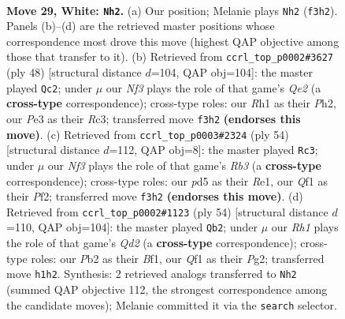 \documentclass[11pt]{article}
\begin{document}
\clearpage

\begin{figure}[p]\centering
\begin{subfigure}{0.46\textwidth}\centering
\resizebox{\linewidth}{!}{%
\newchessgame
\chessboard[
  setfen={rk3b2/pp4pr/2p1b2p/P2p1p2/2qP3P/2B1PN2/1PK2PP1/1R3Q1R w - - 9 29},
  showmover=false,
  pgfstyle=straightmove, color=movearrow, markmove={f3-h2}
]}
\caption{}
\end{subfigure}\hfill
\begin{subfigure}{0.46\textwidth}\centering
\resizebox{\linewidth}{!}{%
\newchessgame
\chessboard[
  setfen={r3n1k1/3p1rpp/p3pp2/1qBbP3/2NP1P2/2R5/1P2Q1PP/5RK1 w - - 4 25},
  showmover=false,
  pgfstyle=straightmove, color=movearrow, markmove={e2-c2}
]}
\caption{}
\end{subfigure}
\\[4pt]
\begin{subfigure}{0.46\textwidth}\centering
\resizebox{\linewidth}{!}{%
\newchessgame
\chessboard[
  setfen={3r2k1/3rpp2/1p3b1p/p1q1pPp1/4B3/PR3QPP/1PP2P2/4R1K1 w - - 0 28},
  showmover=false,
  pgfstyle=straightmove, color=movearrow, markmove={b3-c3}
]}
\caption{}
\end{subfigure}\hfill
\begin{subfigure}{0.46\textwidth}\centering
\resizebox{\linewidth}{!}{%
\newchessgame
\chessboard[
  setfen={3r2r1/1p1npbk1/3p1pp1/p6p/PqP1P2P/1PN1R3/3Q1PP1/1R3BK1 w - - 2 28},
  showmover=false,
  pgfstyle=straightmove, color=movearrow, markmove={d2-b2}
]}
\caption{}
\end{subfigure}
\caption{\textbf{Move 29, White: \texttt{Nh2}.} (a) Our position; Melanie plays \texttt{Nh2} (\texttt{f3h2}). Panels (b)--(d) are the retrieved master positions whose correspondence most drove this move (highest QAP objective among those that transfer to it). (b) Retrieved from \texttt{ccrl\_top\_p0002\#3627} (ply 48) [structural distance $d$=104, QAP obj=104]: the master played \texttt{Qc2}; under $\mu$ our \emph{Nf3} plays the role of that game's \emph{Qe2} (a \textbf{cross-type} correspondence); cross-type roles: our \emph{R}h1 as their \emph{P}h2, our \emph{P}e3 as their \emph{R}c3; transferred move \texttt{f3h2} \textbf{(endorses this move)}. (c) Retrieved from \texttt{ccrl\_top\_p0003\#2324} (ply 54) [structural distance $d$=112, QAP obj=8]: the master played \texttt{Rc3}; under $\mu$ our \emph{Nf3} plays the role of that game's \emph{Rb3} (a \textbf{cross-type} correspondence); cross-type roles: our \emph{p}d5 as their \emph{R}e1, our \emph{Q}f1 as their \emph{P}f2; transferred move \texttt{f3h2} \textbf{(endorses this move)}. (d) Retrieved from \texttt{ccrl\_top\_p0002\#1123} (ply 54) [structural distance $d$=110, QAP obj=104]: the master played \texttt{Qb2}; under $\mu$ our \emph{Rh1} plays the role of that game's \emph{Qd2} (a \textbf{cross-type} correspondence); cross-type roles: our \emph{P}b2 as their \emph{B}f1, our \emph{Q}f1 as their \emph{P}g2; transferred move \texttt{h1h2}. Synthesis: 2 retrieved analogs transferred to \texttt{Nh2} (summed QAP objective 112, the strongest correspondence among the candidate moves); Melanie committed it via the \texttt{search} selector.}
\label{fig:thought-m56}
\end{figure}
\end{document}
